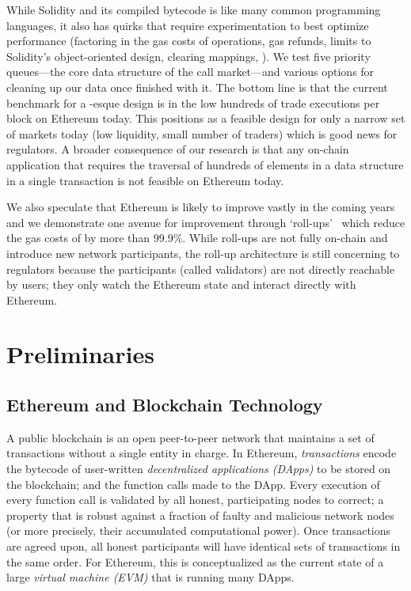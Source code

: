 While Solidity and its compiled bytecode is like many common programming languages, it also has quirks that require experimentation to best optimize performance (\eg factoring in the gas costs of operations, gas refunds, limits to Solidity's object-oriented design, clearing mappings, \etc). We test five priority queues---the core data structure of the call market---and various options for cleaning up our data once finished with it. The bottom line is that the current benchmark for a \cm-esque design is in the low hundreds of trade executions per block on Ethereum today. This positions \cm as a feasible design for only a narrow set of markets today (low liquidity, small number of traders) which is good news for regulators. A broader consequence of our research is that any on-chain application that requires the traversal of hundreds of elements in a data structure in a single transaction is not feasible on Ethereum today.

We also speculate that Ethereum is likely to improve vastly in the coming years and we demonstrate one avenue for improvement through `roll-ups'~\cite{kalodner2018arbitrum} which reduce the gas costs of \cm by more than 99.9\%. While roll-ups are not fully on-chain and introduce new network participants, the roll-up architecture is still concerning to regulators because the participants (called validators) are not directly reachable by users; they only watch the Ethereum state and interact directly with Ethereum.


\section{Preliminaries}

\subsection{Ethereum and Blockchain Technology}

A public blockchain is an open peer-to-peer network that maintains a set of transactions without a single entity in charge. In Ethereum, \emph{transactions} encode the bytecode of user-written \emph{decentralized applications (DApps)} to be stored on the blockchain; and the function calls made to the DApp. Every execution of every function call is validated by all honest, participating nodes to correct; a property that is robust against a fraction of faulty and malicious network nodes (or more precisely, their accumulated computational power). Once transactions are agreed upon, all honest participants will have identical sets of transactions in the same order. For Ethereum, this is conceptualized as the current state of a large \emph{virtual machine (EVM)} that is running many DApps.

